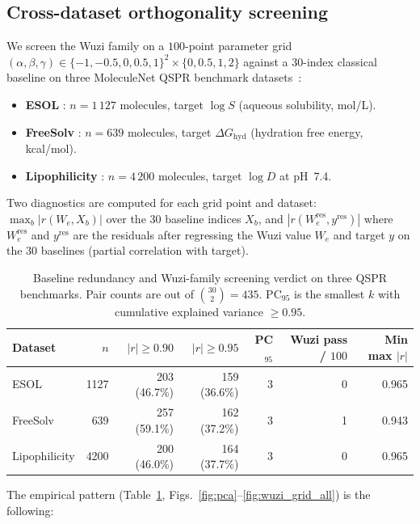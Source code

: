 \documentclass[11pt,a4paper]{article}
\theoremstyle{definition}
\begin{document}
\subsection{Cross-dataset orthogonality screening}\label{sec:cross_dataset}

We screen the Wuzi family on a $100$-point parameter grid
$(\alpha,\beta,\gamma)\in\{-1,-0.5,0,0.5,1\}^2\times\{0,0.5,1,2\}$
against a $30$-index classical baseline on three MoleculeNet QSPR
benchmark datasets~\cite{MoleculeNet}:
\begin{itemize}
\item \textbf{ESOL} \cite{Delaney2004ESOL}: $n=1\,127$ molecules,
target $\log S$ (aqueous solubility, mol/L).
\item \textbf{FreeSolv} \cite{Mobley2014FreeSolv}: $n=639$ molecules,
target $\Delta G_{\mathrm{hyd}}$ (hydration free energy, kcal/mol).
\item \textbf{Lipophilicity} \cite{LipophilicityChEMBL}: $n=4\,200$
molecules, target $\log D$ at pH~7.4.
\end{itemize}

Two diagnostics are computed for each grid point and dataset:
$\max_b |r(W_e, X_b)|$ over the $30$ baseline indices $X_b$, and
$|r(W_e^{\mathrm{res}}, y^{\mathrm{res}})|$ where $W_e^{\mathrm{res}}$
and $y^{\mathrm{res}}$ are the residuals after regressing the
Wuzi value $W_e$ and target $y$ on the $30$ baselines (partial
correlation with target).

\begin{table}[h]
\centering
\caption{Baseline redundancy and Wuzi-family screening verdict on three QSPR benchmarks. Pair counts are out of $\binom{30}{2}=435$. PC$_{95}$ is the smallest $k$ with cumulative explained variance $\ge 0.95$.}
\label{tab:cross_dataset}
\begin{tabular}{lrrrrrr}
\toprule
Dataset & $n$ & $|r|\ge 0.90$ & $|r|\ge 0.95$ & PC$_{95}$
        & Wuzi pass / $100$
        & Min max $|r|$ \\
\midrule
ESOL          & 1127 & 203 (46.7\%) & 159 (36.6\%) & 3 & 0 & 0.965\\
FreeSolv      &  639 & 257 (59.1\%) & 162 (37.2\%) & 3 & 1 & 0.943\\
Lipophilicity & 4200 & 200 (46.0\%) & 164 (37.7\%) & 3 & 0 & 0.965\\
\bottomrule
\end{tabular}
\end{table}

The empirical pattern (Table~\ref{tab:cross_dataset},
Figs.~\ref{fig:pca}--\ref{fig:wuzi_grid_all}) is the following:
\end{document}
